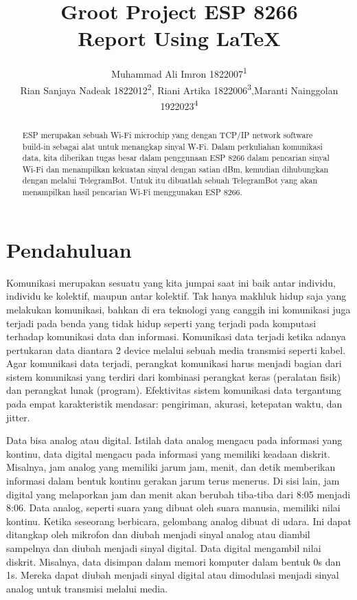 \documentclass[letterpaper]{article} %
\title{Groot Project ESP 8266 \\Report Using \LaTeX{}}
\author{
    Muhammad Ali Imron 1822007\textsuperscript{\rm 1}\\
    Rian Sanjaya Nadeak 1822012\textsuperscript{\rm 2},
    Riani Artika 1822006\textsuperscript{\rm 3},Maranti Nainggolan 1922023\textsuperscript{\rm 4}
}
\begin{document}
\maketitle

\begin{abstract}
    ESP merupakan sebuah Wi-Fi microchip yang dengan TCP/IP network software build-in sebagai alat untuk menangkap sinyal W-Fi. Dalam perkuliahan komunikasi data, kita diberikan tugas besar dalam penggunaan ESP 8266 dalam pencarian sinyal Wi-Fi dan menampilkan kekuatan sinyal dengan satian dBm, kemudian dihubungkan dengan melalui TelegramBot. Untuk itu dibuatlah sebuah TelegramBot yang akan menampilkan hasil pencarian Wi-Fi menggunakan ESP 8266.
\end{abstract}

\section{Pendahuluan}

Komunikasi merupakan sesuatu yang kita jumpai saat ini baik antar individu, individu ke kolektif, maupun antar kolektif. Tak hanya makhluk hidup saja yang melakukan komunikasi, bahkan di era teknologi yang canggih ini komunikasi juga terjadi pada benda yang tidak hidup seperti yang terjadi pada komputasi terhadap komunikasi data dan informasi. Komunikasi data terjadi ketika adanya pertukaran data diantara 2 device melalui sebuah media transmisi seperti kabel. Agar komunikasi data terjadi, perangkat komunikasi harus menjadi bagian dari sistem komunikasi yang terdiri dari kombinasi perangkat keras (peralatan fisik) dan perangkat lunak (program). Efektivitas sistem komunikasi data tergantung pada empat karakteristik mendasar: pengiriman, akurasi, ketepatan waktu, dan jitter.

Data bisa analog atau digital. Istilah data analog mengacu pada informasi yang kontinu, data digital mengacu pada informasi yang memiliki keadaan diskrit. Misalnya, jam analog yang memiliki jarum jam, menit, dan detik memberikan informasi dalam bentuk kontinu gerakan jarum terus menerus. Di sisi lain, jam digital yang melaporkan jam dan menit akan berubah tiba-tiba dari 8:05 menjadi 8:06. Data analog, seperti suara yang dibuat oleh suara manusia, memiliki nilai kontinu. Ketika seseorang berbicara, gelombang analog dibuat di udara. Ini dapat ditangkap oleh mikrofon dan diubah menjadi sinyal analog atau diambil sampelnya dan diubah menjadi sinyal digital. Data digital mengambil nilai diskrit. Misalnya, data disimpan dalam memori komputer dalam bentuk 0s dan 1s. Mereka dapat diubah menjadi sinyal digital atau dimodulasi menjadi sinyal analog untuk transmisi melalui media.
\end{document}
